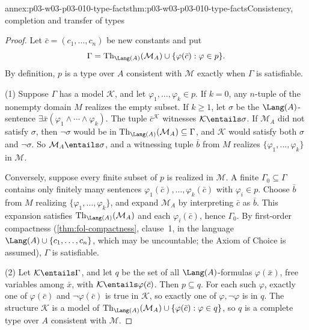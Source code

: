\begin{annexitem}{annex:p03-w03-p03-010-type-facts}{thm:p03-w03-p03-010-type-facts}{Consistency, completion and transfer of types}
\begin{proof}
Let \(\bar c=(c_1,\ldots,c_n)\) be new constants and put
\[
  \Gamma=\operatorname{Th}_{\Lang(A)}(\mathcal M_A)\cup\{\varphi(\bar c):\varphi\in p\}.
\]
By definition, \(p\) is a type over \(A\) consistent with \(\mathcal M\)
exactly when \(\Gamma\) is satisfiable.

(1) Suppose \(\Gamma\) has a model \(\mathcal K\), and let
\(\varphi_1,\ldots,\varphi_k\in p\).  If \(k=0\), any \(n\)-tuple of the
nonempty domain \(M\) realizes the empty subset.  If \(k\geq1\), let
\(\sigma\) be the \(\Lang(A)\)-sentence
\(\exists\bar x(\varphi_1\land\cdots\land\varphi_k)\).  The tuple
\(\bar c^{\mathcal K}\) witnesses \(\mathcal K\entails\sigma\).  If
\(\mathcal M_A\) did not satisfy \(\sigma\), then \(\neg\sigma\) would be
in \(\operatorname{Th}_{\Lang(A)}(\mathcal M_A)\subseteq\Gamma\), and \(\mathcal K\)
would satisfy both \(\sigma\) and \(\neg\sigma\).  So
\(\mathcal M_A\entails\sigma\), and a witnessing tuple \(\bar b\) from
\(M\) realizes \(\{\varphi_1,\ldots,\varphi_k\}\) in \(\mathcal M\).

Conversely, suppose every finite subset of \(p\) is realized in
\(\mathcal M\).  A finite \(\Gamma_0\subseteq\Gamma\) contains only
finitely many sentences \(\varphi_1(\bar c),\ldots,\varphi_k(\bar c)\)
with \(\varphi_i\in p\).  Choose \(\bar b\) from \(M\) realizing
\(\{\varphi_1,\ldots,\varphi_k\}\), and expand \(\mathcal M_A\) by
interpreting \(\bar c\) as \(\bar b\).  This expansion satisfies
\(\operatorname{Th}_{\Lang(A)}(\mathcal M_A)\) and each \(\varphi_i(\bar c)\), hence
\(\Gamma_0\).  By first-order compactness (\cref{thm:fol-compactness},
clause~1, in the language \(\Lang(A)\cup\{c_1,\ldots,c_n\}\), which may
be uncountable; the Axiom of Choice is assumed), \(\Gamma\) is satisfiable.

(2) Let \(\mathcal K\entails\Gamma\), and let \(q\) be the set of all
\(\Lang(A)\)-formulas \(\varphi(\bar x)\), free variables among \(\bar x\),
with \(\mathcal K\entails\varphi(\bar c)\).  Then \(p\subseteq q\).  For
each such \(\varphi\), exactly one of \(\varphi(\bar c)\) and
\(\neg\varphi(\bar c)\) is true in \(\mathcal K\), so exactly one of
\(\varphi,\neg\varphi\) is in \(q\).  The structure \(\mathcal K\) is a model
of \(\operatorname{Th}_{\Lang(A)}(\mathcal M_A)\cup\{\varphi(\bar c):\varphi\in q\}\),
so \(q\) is a complete type over \(A\) consistent with \(\mathcal M\).


\end{proof}
\end{annexitem}
